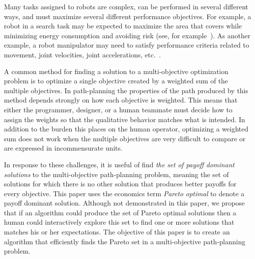 \documentclass{article}
\begin{document}
Many tasks assigned to robots are complex, can be performed in several different ways, and must maximize several different performance objectives.  
For example, a robot in a search task may be expected to maximize the area that covers while minimizing energy consumption and avoiding risk (see, for example~\cite{yi2014supporting,mei2005deployment}). 
As another example, a robot manipulator may need to satisfy performance criteria related to movement, joint velocities, joint accelerations, etc.~\cite{Pires2004}.


A common method for finding a solution to a multi-objective optimization problem is to optimize a single objective created by a weighted sum of the multiple objectives.  
In path-planning the properties of the path produced by this method depends strongly on how each objective is weighted. This means that either the programmer, designer, or a human teammate must decide how to assign the weights so that the qualitative behavior matches what is intended.  
In addition to the burden this places on the human operator, optimizing a weighted sum does not work when the multiple objectives are very difficult to compare or are expressed in incommensurate units.

In response to these challenges, it is useful of find {\em the set of payoff dominant solutions} to the multi-objective path-planning problem, meaning the set of solutions for which there is no other solution that produces better payoffs for every objective.   
This paper uses the economics term {\em Pareto optimal} to denote a payoff dominant solution.  Although not demonstrated in this paper, we propose that if an algorithm could produce the set of Pareto optimal solutions then a human could interactively explore this set to find one or more solutions that matches his or her expectations. 
The objective of this paper is to create an algorithm that efficiently finds the Pareto set in a multi-objective path-planning problem.
\end{document}
